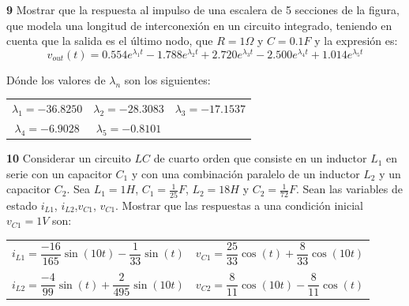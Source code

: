 \documentclass[10pt,a4paper]{article} %
\begin{document}
	\textbf{9} Mostrar que la respuesta al impulso de una escalera de 5 secciones de la figura, que modela una longitud de interconexión en un circuito integrado, teniendo en cuenta que la salida es el último nodo, que $R=1\Omega$ y $C=0.1F$ y la expresión es:
	\begin{equation}
		v_{out}(t)=0.554e^{\lambda_1 t}-1.788e^{\lambda_2 t}+2.720e^{\lambda_3 t}-2.500e^{\lambda_4 t}+1.014e^{\lambda_5 t}
	\end{equation}
	
	Dónde los valores de $\lambda_n$ son los siguientes:
	\begin{center}
		\begin{tabular}{ccc}
			$\lambda_1=-36.8250$ & $\lambda_2=-28.3083$ & $\lambda_3=-17.1537$ \\ 
			$\lambda_4=-6.9028$ & $\lambda_5=-0.8101$ &  \\
		\end{tabular} 
	\end{center}

	\textbf{10} Considerar un circuito $LC$ de cuarto orden que consiste en un inductor $L_1$ en serie con un capacitor $C_1$ y con una combinación paralelo de un inductor $L_2$ y un capacitor $C_2$. Sea $L_1=1H$, $C_1=\frac{1}{25}F$, $L_2=18H$ y $C_2=\frac{1}{72}F$. Sean las variables de estado $i_{L1}$, $i_{L2}$,$v_{C1}$, $v_{C1}$. Mostrar que las respuestas a una condición inicial $v_{C1}=1V$ son:
	\begin{center}
		\begin{tabular}{cc}
			$i_{L1}=\dfrac{-16}{165}\sin(10t)-\dfrac{1}{33}\sin(t)$& $v_{C1}=\dfrac{25}{33}\cos(t)+\dfrac{8}{33}\cos(10t)$\\
			&\\ 
			$i_{L2}=\dfrac{-4}{99}\sin(t)+\dfrac{2}{495}\sin(10t)$ & $v_{C2}=\dfrac{8}{11}\cos(10t)-\dfrac{8}{11}\cos(t)$\\
		\end{tabular} 
	\end{center}
	
\end{document}
